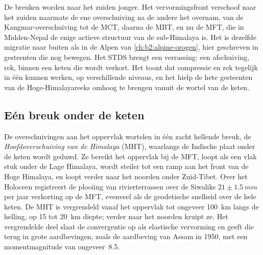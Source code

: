 De breuken worden naar het zuiden jonger. Het vervormingsfront verschoof naar het zuiden naarmate de ene overschuiving na de andere
het overnam, van de Kangmar-overschuiving tot de MCT, daarna de MBT, en nu de MFT, die in
Midden-Nepal de enige actieve structuur van de sub-Himalaya is. Het is dezelfde migratie naar buiten
als in de Alpen van \cref{ch:b2:alpine-orogen}, hier geschreven in gesteenten die nog
bewegen. Het STDS brengt een verrassing: een afschuiving, rek, binnen een keten die wordt
verkort. Het toont dat compressie en rek tegelijk in één  kunnen werken,
op verschillende niveaus, en het hielp de hete gesteenten van de Hoge-Himalayareeks omhoog te brengen
vanuit de wortel van de keten.

\subsection{Eén breuk onder de keten}

De overschuivingen aan het oppervlak wortelen in één zacht hellende breuk, de
\emph{Hoofdoverschuiving van de Himalaya} (MHT), waarlangs de Indische plaat onder de keten wordt geduwd. Ze bereikt
het oppervlak bij de MFT, loopt als een vlak stuk onder de Lage Himalaya, wordt steiler tot een ramp aan
het front van de Hoge Himalaya, en loopt verder naar het noorden onder Zuid-Tibet. Over het Holoceen
registreert de plooiing van rivierterrassen over de Siwaliks $21 \pm \qty{1.5}{mm}$ per jaar
verkorting op de MFT, evenveel als de geodetische snelheid over de hele keten. De MHT is
vergrendeld vanaf het oppervlak tot ongeveer \qty{100}{km} langs de helling, op 15 tot \qty{20}{km} diepte; verder
naar het noorden kruipt ze. Het vergrendelde deel slaat de convergentie op als elastische vervorming en geeft die terug
in grote aardbevingen, zoals de aardbeving van Assam in 1950, met een momentmagnitude van ongeveer~8.5.

